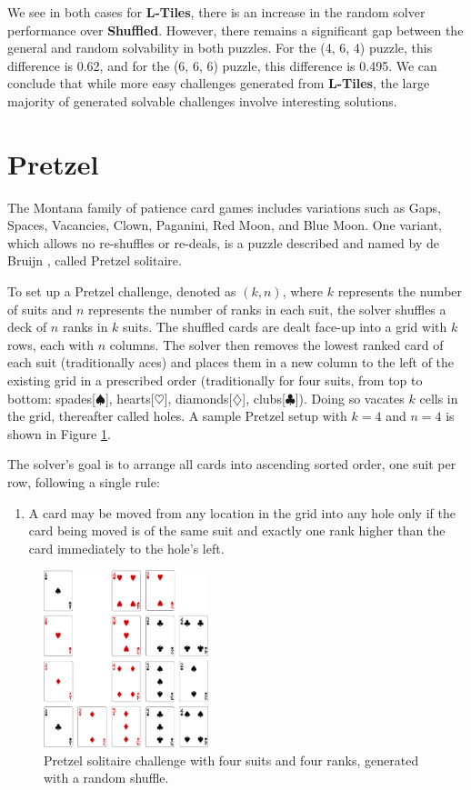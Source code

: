 \documentclass[journal]{IEEEtran}
\begin{document}
We see in both cases for {\bf L-Tiles}, there is an increase in the random solver performance over {\bf Shuffled}. However, there remains a significant gap between the general and random solvability in both puzzles. For the (4, 6, 4) puzzle, this difference is 0.62, and for the (6, 6, 6) puzzle, this difference is 0.495. We can conclude that while more easy challenges generated from {\bf L-Tiles}, the large majority of generated solvable challenges involve interesting solutions.


\section{Pretzel}
\noindent
The Montana family of patience card games includes variations such as Gaps, Spaces, Vacancies, Clown, Paganini, Red Moon, and Blue Moon. One variant, which allows no re-shuffles or re-deals, is a puzzle described and named by de Bruijn \cite{de1981pretzel}, called Pretzel solitaire.

To set up a Pretzel challenge, denoted as $(k,n)$, where $k$ represents the number of suits and $n$ represents the number of ranks in each suit, the solver shuffles a deck of $n$ ranks in $k$ suits. The shuffled cards are dealt face-up into a grid with $k$ rows, each with $n$ columns. The solver then removes the lowest ranked card of each suit (traditionally aces) and places them in a new column to the left of the existing grid in a prescribed order (traditionally for four suits, from top to bottom: spades[$\spadesuit$], hearts[$\heartsuit$], diamonds[$\diamondsuit$], clubs[$\clubsuit$]). Doing so vacates $k$ cells in the grid, thereafter called holes. A sample Pretzel setup with $k=4$ and $n=4$ is shown in Figure \ref{fig:pretzelbasic}.

The solver's goal is to arrange all cards into ascending sorted order, one suit per row, following a single rule:

\begin{enumerate}
    \item A card may be moved from any location in the grid into any hole only if the card being moved is of the same suit and exactly one rank higher than the card immediately to the hole's left.
\end{enumerate}

\begin{figure}[t]
\centering
\includegraphics[width=4.8cm]{pretzelbasic.png}
\caption{Pretzel solitaire challenge with four suits and four ranks, generated with a random shuffle.}
\label{fig:pretzelbasic}
\end{figure}
\end{document}
